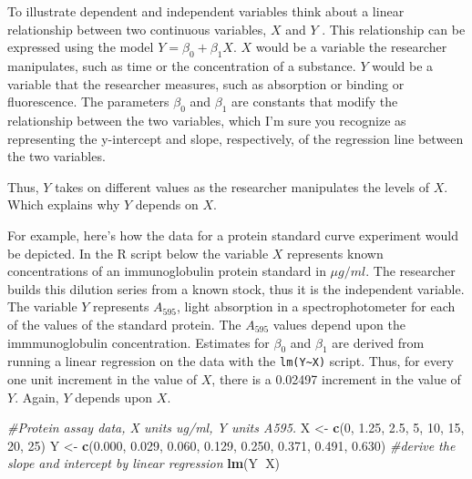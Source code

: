 \documentclass[]{book}
\newenvironment{Shaded}{\begin{snugshade}}{\end{snugshade}}
\newcommand{\CommentTok}[1]{\textcolor[rgb]{0.56,0.35,0.01}{\textit{#1}}}
\newcommand{\DecValTok}[1]{\textcolor[rgb]{0.00,0.00,0.81}{#1}}
\newcommand{\FloatTok}[1]{\textcolor[rgb]{0.00,0.00,0.81}{#1}}
\newcommand{\KeywordTok}[1]{\textcolor[rgb]{0.13,0.29,0.53}{\textbf{#1}}}
\newcommand{\NormalTok}[1]{#1}
\newcommand{\OperatorTok}[1]{\textcolor[rgb]{0.81,0.36,0.00}{\textbf{#1}}}
\newcommand{\StringTok}[1]{\textcolor[rgb]{0.31,0.60,0.02}{#1}}
\begin{document}
To illustrate dependent and independent variables think about a linear relationship between two continuous variables, \(X\) and \(Y\) . This relationship can be expressed using the model \(Y=\beta_0 + \beta_1 X\). \(X\) would be a variable the researcher manipulates, such as time or the concentration of a substance. \(Y\) would be a variable that the researcher measures, such as absorption or binding or fluorescence. The parameters \(\beta_0\) and \(\beta_1\) are constants that modify the relationship between the two variables, which I'm sure you recognize as representing the y-intercept and slope, respectively, of the regression line between the two variables.

Thus, \(Y\) takes on different values as the researcher manipulates the levels of \(X\). Which explains why \(Y\) depends on \(X\).

For example, here's how the data for a protein standard curve experiment would be depicted. In the R script below the variable \(X\) represents known concentrations of an immunoglobulin protein standard in \(\mu g/ml\). The researcher builds this dilution series from a known stock, thus it is the independent variable. The variable \(Y\) represents \(A_{595}\), light absorption in a spectrophotometer for each of the values of the standard protein. The \(A_{595}\) values depend upon the immmunoglobulin concentration. Estimates for \(\beta_0\) and \(\beta_1\) are derived from running a linear regression on the data with the \texttt{lm(Y\textasciitilde{}X)} script. Thus, for every one unit increment in the value of \(X\), there is a 0.02497 increment in the value of \(Y\). Again, \(Y\) depends upon \(X\).

\begin{Shaded}
\begin{Highlighting}[]
\CommentTok{#Protein assay data, X units ug/ml, Y units A595.}
\NormalTok{X <-}\StringTok{ }\KeywordTok{c}\NormalTok{(}\DecValTok{0}\NormalTok{, }\FloatTok{1.25}\NormalTok{, }\FloatTok{2.5}\NormalTok{, }\DecValTok{5}\NormalTok{, }\DecValTok{10}\NormalTok{, }\DecValTok{15}\NormalTok{, }\DecValTok{20}\NormalTok{, }\DecValTok{25}\NormalTok{)}
\NormalTok{Y <-}\StringTok{ }\KeywordTok{c}\NormalTok{(}\FloatTok{0.000}\NormalTok{, }\FloatTok{0.029}\NormalTok{, }\FloatTok{0.060}\NormalTok{, }\FloatTok{0.129}\NormalTok{, }\FloatTok{0.250}\NormalTok{, }\FloatTok{0.371}\NormalTok{, }\FloatTok{0.491}\NormalTok{, }\FloatTok{0.630}\NormalTok{)}
\CommentTok{#derive the slope and intercept by linear regression}
\KeywordTok{lm}\NormalTok{(Y}\OperatorTok{~}\NormalTok{X)}
\end{Highlighting}
\end{Shaded}
\end{document}
